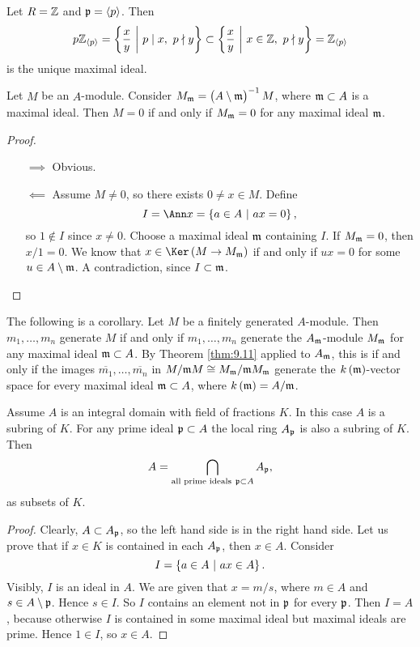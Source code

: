 \begin{example}
Let $ R = \mathbb{Z} $ and $ \mathfrak{p} = \left\langle p \right\rangle $. Then
$$ p\ZZ_{\abr{p}} = \cbr{\dfrac{x}{y} \st p \mid x, \ p \nmid y} \subset \cbr{\dfrac{x}{y} \st x \in \ZZ, \ p \nmid y} = \ZZ_{\abr{p}} $$
is the unique maximal ideal.
\end{example}

\begin{proposition}
Let $ M $ be an $ A $-module. Consider $ M_\mmm = \br{A \setminus \mmm}^{-1}M $, where $ \mathfrak{m} \subset A $ is a maximal ideal. Then $ M = 0 $ if and only if $ M_{\mathfrak{m}} = 0 $ for any maximal ideal $ \mathfrak{m} $.
\end{proposition}

\begin{proof}
\hfill
\begin{itemize}
\item[$ \implies $] Obvious.
\item[$ \impliedby $] Assume $ M \ne 0 $, so there exists $ 0 \ne x \in M $. Define
$$ I = \Ann x = \cbr{a \in A \st ax = 0}, $$
so $ 1 \notin I $ since $ x \ne 0 $. Choose a maximal ideal $ \mathfrak{m} $ containing $ I $. If $ M_{\mathfrak{m}} = 0 $, then $ x / 1 = 0 $. We know that $ x \in \Ker \br{M \to M_\mmm} $ if and only if $ ux = 0 $ for some $ u \in A \setminus \mathfrak{m} $. A contradiction, since $ I \subset \mathfrak{m} $.
\end{itemize}
\end{proof}

The following is a corollary. Let $ M $ be a finitely generated $ A $-module. Then $ m_1, \dots, m_n $ generate $ M $ if and only if $ m_1, \dots, m_n $ generate the $ A_{\mathfrak{m}} $-module $ M_{\mathfrak{m}} $ for any maximal ideal $ \mathfrak{m} \subset A $. By Theorem \ref{thm:9.11} applied to $ A_{\mathfrak{m}} $, this is if and only if the images $ \overline{m_1}, \dots, \overline{m_n} $ in $ M / \mathfrak{m} M \cong M_{\mathfrak{m}} / \mathfrak{m} M_{\mathfrak{m}} $ generate the $ k\br{\mmm} $-vector space for every maximal ideal $ \mathfrak{m} \subset A $, where $ k\br{\mmm} = A / \mmm $.

\begin{corollary}
\label{cor:10.6}
Assume $ A $ is an integral domain with field of fractions $ K $. In this case $ A $ is a subring of $ K $. For any prime ideal $ \mathfrak{p} \subset A $ the local ring $ A_{\mathfrak{p}} $ is also a subring of $ K $. Then
$$ A = \bigcap_{\text{all prime ideals} \ \ppp \subset A} A_\ppp, $$
as subsets of $ K $.
\end{corollary}

\begin{proof}
Clearly, $ A \subset A_{\mathfrak{p}} $, so the left hand side is in the right hand side. Let us prove that if $ x \in K $ is contained in each $ A_{\mathfrak{p}} $, then $ x \in A $. Consider
$$ I = \cbr{a \in A \st ax \in A}. $$
Visibly, $ I $ is an ideal in $ A $. We are given that $ x = m / s $, where $ m \in A $ and $ s \in A \setminus \mathfrak{p} $. Hence $ s \in I $. So $ I $ contains an element not in $ \mathfrak{p} $ for every $ \mathfrak{p} $. Then $ I = A $, because otherwise $ I $ is contained in some maximal ideal but maximal ideals are prime. Hence $ 1 \in I $, so $ x \in A $.
\end{proof}

